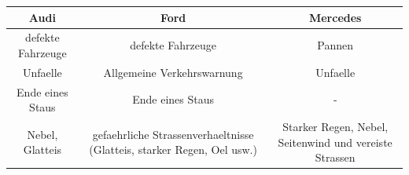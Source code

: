 \documentclass[
]{book}
\begin{document}
\begin{longtable}[]{@{}ccc@{}}
\toprule
\begin{minipage}[b]{0.30\columnwidth}\centering
Audi\strut
\end{minipage} & \begin{minipage}[b]{0.30\columnwidth}\centering
Ford\strut
\end{minipage} & \begin{minipage}[b]{0.30\columnwidth}\centering
Mercedes\strut
\end{minipage}\tabularnewline
\midrule
\endhead
\begin{minipage}[t]{0.30\columnwidth}\centering
defekte Fahrzeuge\strut
\end{minipage} & \begin{minipage}[t]{0.30\columnwidth}\centering
defekte Fahrzeuge\strut
\end{minipage} & \begin{minipage}[t]{0.30\columnwidth}\centering
Pannen\strut
\end{minipage}\tabularnewline
\begin{minipage}[t]{0.30\columnwidth}\centering
Unfaelle\strut
\end{minipage} & \begin{minipage}[t]{0.30\columnwidth}\centering
Allgemeine Verkehrswarnung\strut
\end{minipage} & \begin{minipage}[t]{0.30\columnwidth}\centering
Unfaelle\strut
\end{minipage}\tabularnewline
\begin{minipage}[t]{0.30\columnwidth}\centering
Ende eines Staus\strut
\end{minipage} & \begin{minipage}[t]{0.30\columnwidth}\centering
Ende eines Staus\strut
\end{minipage} & \begin{minipage}[t]{0.30\columnwidth}\centering
-\strut
\end{minipage}\tabularnewline
\begin{minipage}[t]{0.30\columnwidth}\centering
Nebel, Glatteis\strut
\end{minipage} & \begin{minipage}[t]{0.30\columnwidth}\centering
gefaehrliche Strassenverhaeltnisse (Glatteis, starker Regen, Oel usw.)\strut
\end{minipage} & \begin{minipage}[t]{0.30\columnwidth}\centering
Starker Regen, Nebel, Seitenwind und vereiste Strassen\strut

\end{minipage}
\end{longtable}
\end{document}
